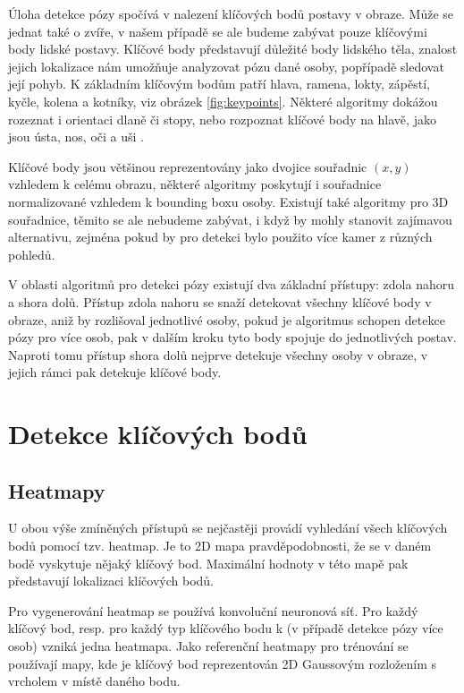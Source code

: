Úloha detekce pózy spočívá v nalezení klíčových bodů postavy v obraze. Může se
jednat také o zvíře, v našem případě se ale budeme zabývat pouze klíčovými body
lidské postavy. Klíčové body představují důležité body lidského těla, znalost
jejich lokalizace nám umožňuje analyzovat pózu dané osoby, popřípadě sledovat
její pohyb. K základním klíčovým bodům patří hlava, ramena, lokty, zápěstí,
kyčle, kolena a kotníky, viz obrázek \ref{fig:keypoints}. Některé algoritmy dokážou
rozeznat i orientaci dlaně či stopy, nebo rozpoznat klíčové body na hlavě, jako
jsou ústa, nos, oči a uši \cite{blazepose}.

Klíčové body jsou většinou reprezentovány jako dvojice souřadnic $(x, y)$
vzhledem k celému obrazu, některé algoritmy poskytují i souřadnice
normalizované vzhledem k bounding boxu osoby. Existují také algoritmy pro 3D
souřadnice, těmito se ale nebudeme zabývat, i když by mohly stanovit zajímavou
alternativu, zejména pokud by pro detekci bylo použito více kamer z různých
pohledů.

V oblasti algoritmů pro detekci pózy existují dva základní přístupy: zdola
nahoru a shora dolů. Přístup zdola nahoru se snaží detekovat všechny klíčové
body v obraze, aniž by rozlišoval jednotlivé osoby, pokud je algoritmus schopen
detekce pózy pro více osob, pak v dalším kroku tyto body spojuje do
jednotlivých postav. Naproti tomu přístup shora dolů nejprve detekuje všechny
osoby v obraze, v jejich rámci pak detekuje klíčové body.

\section{Detekce klíčových bodů}

\subsection{Heatmapy}

U obou výše zmíněných přístupů se nejčastěji provádí vyhledání všech klíčových
bodů pomocí tzv. heatmap. Je to 2D mapa pravděpodobnosti, že se v daném bodě
vyskytuje nějaký klíčový bod. Maximální hodnoty v této mapě pak představují
lokalizaci klíčových bodů.

Pro vygenerování heatmap se používá konvoluční neuronová síť. Pro každý klíčový
bod, resp. pro každý typ klíčového bodu k (v případě detekce pózy více osob)
vzniká jedna heatmapa. Jako referenční heatmapy pro trénování se používají
mapy, kde je klíčový bod reprezentován 2D Gaussovým rozložením s vrcholem v
místě daného bodu.

